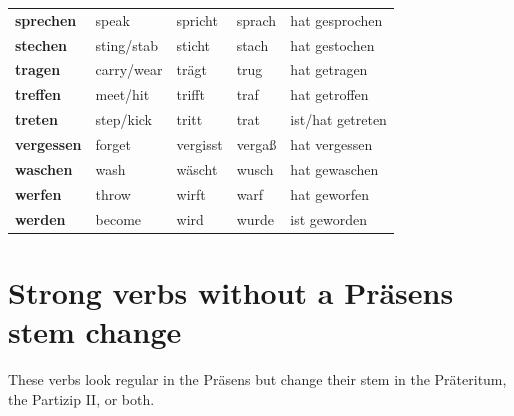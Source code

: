 \begin{center}
\begin{tabularx}{\textwidth}{@{}>{\bfseries}l l l l X@{}}
sprechen & speak & spricht & sprach & hat gesprochen \\
stechen & sting/stab & sticht & stach & hat gestochen \\
tragen & carry/wear & trägt & trug & hat getragen \\
treffen & meet/hit & trifft & traf & hat getroffen \\
treten & step/kick & tritt & trat & ist/hat getreten \\
vergessen & forget & vergisst & vergaß & hat vergessen \\
waschen & wash & wäscht & wusch & hat gewaschen \\
werfen & throw & wirft & warf & hat geworfen \\
werden & become & wird & wurde & ist geworden \\
\bottomrule
\end{tabularx}
\end{center}

\section{Strong verbs without a Präsens stem change}

These verbs look regular in the Präsens but change their stem in the
Präteritum, the Partizip II, or both.

